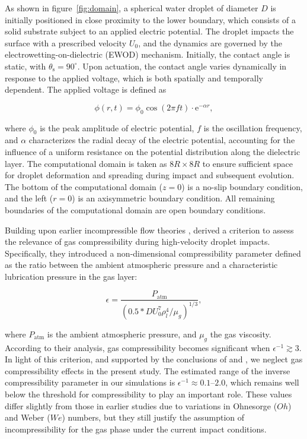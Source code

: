 \documentclass[lineno]{cls/jfm}
\begin{document}
 As shown in figure~\ref{fig:domain}, a spherical water droplet of diameter $D$ is initially positioned in close proximity to the lower boundary, which consists of a solid substrate subject to an applied electric potential. The droplet impacts the surface with a prescribed velocity $U_0$, and the dynamics are governed by the electrowetting-on-dielectric (EWOD) mechanism. Initially, the contact angle is static, with $\theta_{\mathrm{s}} = 90^\circ$. Upon actuation, the contact angle varies dynamically in response to the applied voltage, which is both spatially and temporally dependent. The applied voltage is defined as

\begin{equation}
  \phi(r,t) = \phi_0 \cos(2\pi f t) \cdot \mathrm{e}^{- \alpha r},
  \label{dynamic electric potential}
\end{equation}

\noindent where $\phi_0$ is the peak amplitude of electric potential, $f$ is the oscillation frequency, and $\alpha$ characterizes the radial decay of the electric potential, accounting for the influence of a uniform resistance on the potential distribution along the dielectric layer. The computational domain is taken as $8R \times 8R$ to ensure sufficient space for droplet deformation and spreading during impact and subsequent evolution. The bottom of the computational domain ($z = 0$) is a no-slip boundary condition, and the left ($r = 0$) is an axisymmetric boundary condition. All remaining boundaries of the computational domain are open boundary conditions.

Building upon earlier incompressible flow theories \citep{smith_air_2003, korobkin_trapping_2008}, \citet{mandre_precursors_2009} derived a criterion to assess the relevance of gas compressibility during high-velocity droplet impacts. Specifically, they introduced a non-dimensional compressibility parameter defined as the ratio between the ambient atmospheric pressure and a characteristic lubrication pressure in the gas layer:

\begin{equation}
  \epsilon = \frac{P_{\mathrm{atm}}}{\left(0.5 * D U_0^7 \rho_l^4 / \mu_g \right)^{1/3}},
  \label{compressibility equation}
\end{equation}

\noindent where $P_{\mathrm{atm}}$ is the ambient atmospheric pressure, and $\mu_g$ the gas viscosity. According to their analysis, gas compressibility becomes significant when $\epsilon^{-1} \gtrsim 3$. In light of this criterion, and supported by the conclusions of \citet{li_time-resolved_2015} and \citet{mandre_precursors_2009}, we neglect gas compressibility effects in the present study. The estimated range of the inverse compressibility parameter in our simulations is $\epsilon^{-1} \approx 0.1 \text{--} 2.0$, which remains well below the threshold for compressibility to play an important role. These values differ slightly from those in earlier studies due to variations in Ohnesorge ($Oh$) and Weber ($We$) numbers, but they still justify the assumption of incompressibility for the gas phase under the current impact conditions.
\end{document}
